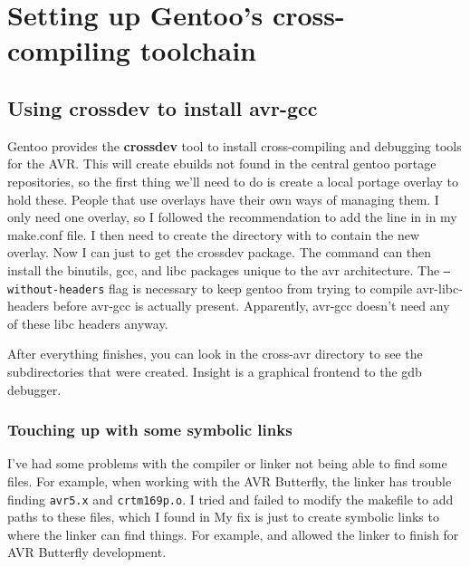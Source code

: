 \section{Setting up Gentoo's cross-compiling toolchain}

\subsection{Using \textbf{crossdev} to install \textbf{avr-gcc}}
Gentoo provides the \textbf{crossdev} tool to install cross-compiling
and debugging tools for the AVR.  This will create ebuilds not found
in the central gentoo portage repositories, so the first thing we'll
need to do is create a local portage overlay to hold these.  People
that use overlays have their own ways of managing them.  I only need
one overlay, so I followed the recommendation to add the line
in in my make.conf file.  I then need to create the directory with
to contain the new overlay.  Now I can just
to get the crossdev package.  The command
can then install the binutils, gcc, and libc packages unique to the
avr architecture.  The \texttt{--without-headers} flag is necessary to
keep gentoo from trying to compile avr-libc-headers before avr-gcc is
actually present.  Apparently, avr-gcc doesn't need any of these libc
headers anyway.

After everything finishes, you can look in the cross-avr directory
to see the subdirectories that were created.  Insight is a graphical
frontend to the gdb debugger.

\subsubsection{Touching up with some symbolic links}
I've had some problems with the compiler or linker not being able to find some files.  For example, when working with the AVR Butterfly, the linker has trouble finding \texttt{avr5.x} and \texttt{crtm169p.o}.  I tried and failed to modify the makefile to add paths to these files, which I found in
My fix is just to create symbolic links to where the linker can find things.  For example,
and
allowed the linker to finish for AVR Butterfly development.


